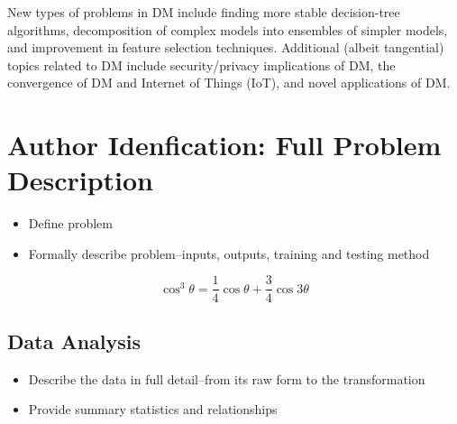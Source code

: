 \documentclass[fleqn,10pt]{SelfArx} %
\begin{document}
New types of problems in DM include finding more stable decision-tree algorithms, decomposition of complex models into ensembles of simpler models, and improvement in feature selection techniques. \cite{Wu:2007:TAD:1327434.1327436} Additional (albeit tangential) topics related to DM include security/privacy implications of DM, the convergence of DM and Internet of Things (IoT), and novel applications of DM.






%
%   
\section{Author Idenfication: Full Problem Description}
\begin{itemize}[noitemsep]
\item Define problem
\item Formally describe problem--inputs, outputs, training and testing method
\end{itemize}


\lipsum[4] %

\begin{equation}
\cos^3 \theta =\frac{1}{4}\cos\theta+\frac{3}{4}\cos 3\theta
\label{eq:refname2}
\end{equation}

\lipsum[5] %


\subsection{Data Analysis}
\begin{itemize}[noitemsep]
\item Describe the data in full detail--from its raw form to the transformation
\item Provide summary statistics and relationships
\end{itemize}

\lipsum[6] %
\end{document}
